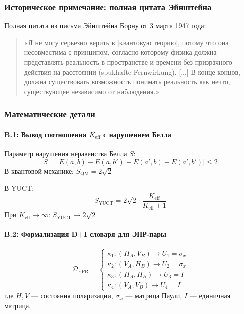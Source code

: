 \documentclass[11pt,a4paper]{article}
\begin{document}
	\subsubsection*{Историческое примечание: полная цитата Эйнштейна}
	Полная цитата из письма Эйнштейна Борну от 3 марта 1947 года:
	
	\begin{quote}
		«Я не могу серьезно верить в [квантовую теорию], потому что она несовместима с принципом, согласно которому физика должна представлять реальность в пространстве и времени без призрачного действия на расстоянии (spukhafte Fernwirkung). [...] В конце концов, должна существовать возможность понимать реальность как нечто, существующее независимо от наблюдения.»
	\end{quote}
	
	\subsubsection*{Математические детали}
	
	\paragraph{B.1: Вывод соотношения $K_{\mathrm{eff}}$ с нарушением Белла}
	Параметр нарушения неравенства Белла $S$:
	\begin{equation}
		S = |E(a,b) - E(a,b') + E(a',b) + E(a',b')| \leq 2
	\end{equation}
	В квантовой механике: $S_{\text{QM}} = 2\sqrt{2}$
	
	В YUCT:
	\begin{equation}
		S_{\text{YUCT}} = 2\sqrt{2} \cdot \frac{K_{\mathrm{eff}}}{K_{\mathrm{eff}} + 1}
	\end{equation}
	При $K_{\mathrm{eff}} \to \infty$: $S_{\text{YUCT}} \to 2\sqrt{2}$
	\paragraph{B.2: Формализация \protect\mbox{D+I} словаря для ЭПР-пары}
	\begin{equation}
		\mathcal{D}_{\text{EPR}} = 
		\begin{cases}
			\kappa_1: (H_A, V_B) \to U_1 = \sigma_x \\
			\kappa_2: (V_A, H_B) \to U_2 = \sigma_x \\
			\kappa_3: (H_A, H_B) \to U_3 = I \\
			\kappa_4: (V_A, V_B) \to U_4 = I
		\end{cases}
	\end{equation}
	где $H,V$ — состояния поляризации, $\sigma_x$ — матрица Паули, $I$ — единичная матрица.
	
\end{document}
